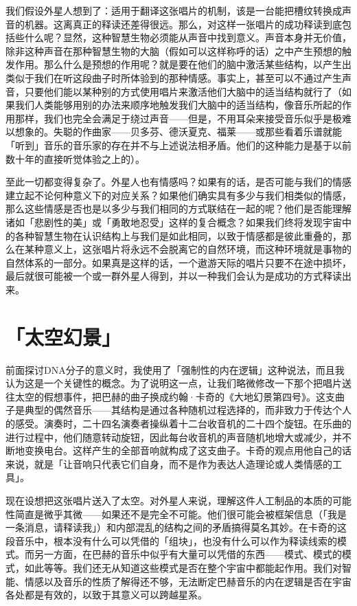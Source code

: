 \documentclass[
  12pt,
  twoside,
  openright,
  oldfontcommands,
]{memoir}
\begin{document}
我们假设外星人想到了：适用于翻译这张唱片的机制，该是一台能把槽纹转换成声音的机器。这离真正的释读还差得很远。那么，对这样一张唱片的成功释读到底包括些什么呢？显然，这种智慧生物必须能从声音中找到意义。声音本身并无价值，除非这种声音在那种智慧生物的大脑（假如可以这样称呼的话）之中产生预想的触发作用。那么什么是预想的作用呢？就是要在他们的脑中激活某些结构，以产生出类似于我们在听这段曲子时所体验到的那种情感。事实上，甚至可以不通过产生声音，只要他们能以某种别的方式使用唱片来激活他们大脑中的适当结构就行了（如果我们人类能够用别的办法来顺序地触发我们大脑中的适当结构，像音乐所起的作用那样，我们也完全会满足于绕过声音------但是，不用耳朵来接受音乐似乎是极难以想象的。失聪的作曲家------贝多芬、德沃夏克、福莱------或那些看着乐谱就能「听到」音乐的音乐家的存在并不与上述说法相矛盾。他们的这种能力是基于以前数十年的直接听觉体验之上的）。

至此一切都变得复杂了。外星人也有情感吗？如果有的话，是否可能与我们的情感建立起不论何种意义下的对应关系？如果他们确实具有多少与我们相类似的情感，那么这些情感是否也是以多少与我们相同的方式联结在一起的呢？他们是否能理解诸如「悲剧性的美」或「勇敢地忍受」这样的复合概念？如果我们终将发现宇宙中的各种智慧生物在认识结构上与我们是如此相同，以致于情感都是彼此重叠的，那么在某种意义上，这张唱片将永远不会脱离它的自然环境，而这种环境就是事物的自然体系的一部分。如果真是这样的话，一个遨游天际的唱片只要不在途中损坏，最后就很可能被一个或一群外星人得到，并以一种我们会认为是成功的方式释读出来。

\section{「太空幻景」}

前面探讨DNA分子的意义时，我使用了「强制性的内在逻辑」这种说法，而且我认为这是一个关键性的概念。为了说明这一点，让我们略微修改一下那个把唱片送往太空的假想事件，把巴赫的曲子换成约翰·卡奇的《大地幻景第四号》。这支曲子是典型的偶然音乐------其结构是通过各种随机过程选择的，而非致力于传达个人的感受。演奏时，二十四名演奏者操纵着十二台收音机的二十四个旋钮。在乐曲的进行过程中，他们随意转动旋钮，因此每台收音机的声音随机地增大或减少，并不断地变换电台。这样产生的全部音响就构成了这支曲子。卡奇的观点用他自己的话来说，就是「让音响只代表它们自身，而不是作为表达人造理论或人类情感的工具」。

现在设想把这张唱片送入了太空。对外星人来说，理解这件人工制品的本质的可能性简直是微乎其微------如果还不是完全不可能。他们很可能会被框架信息（「我是一条消息，请释读我」）和内部混乱的结构之间的矛盾搞得莫名其妙。在卡奇的这段音乐中，根本没有什么可以凭借的「组块」，也没有什么可以作为释读线索的模式。而另一方面，在巴赫的音乐中似乎有大量可以凭借的东西------模式、模式的模式，如此等等。我们还无从知道这些模式是否在整个宇宙中都能起作用。我们对智能、情感以及音乐的性质了解得还不够，无法断定巴赫音乐的内在逻辑是否在宇宙各处都是有效的，以致于其意义可以跨越星系。
\end{document}
